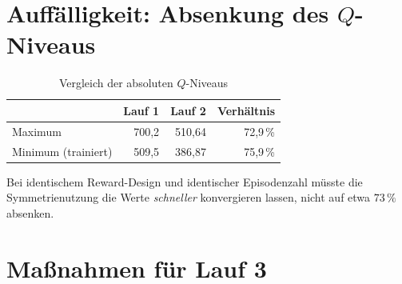 \documentclass[11pt,a4paper]{article}
\begin{document}
\section{Auffälligkeit: Absenkung des \texorpdfstring{$Q$}{Q}-Niveaus}

\begin{table}[htbp]
\centering
\caption{Vergleich der absoluten $Q$-Niveaus}
\label{tab:qniveau}
\begin{tabularx}{0.85\textwidth}{@{}Lrrr@{}}
\toprule
 & \textbf{Lauf 1} & \textbf{Lauf 2} & \textbf{Verhältnis} \\
\midrule
Maximum              & 700,2 & 510,64 & 72,9\,\% \\
Minimum (trainiert)  & 509,5 & 386,87 & 75,9\,\% \\
\bottomrule
\end{tabularx}
\end{table}

\noindent
Bei identischem Reward-Design und identischer Episodenzahl müsste die
Symmetrienutzung die Werte \emph{schneller} konvergieren lassen, nicht auf
etwa $73\,\%$ absenken.

\begin{center}
\end{center}

\section{Maßnahmen für Lauf 3}
\end{document}

